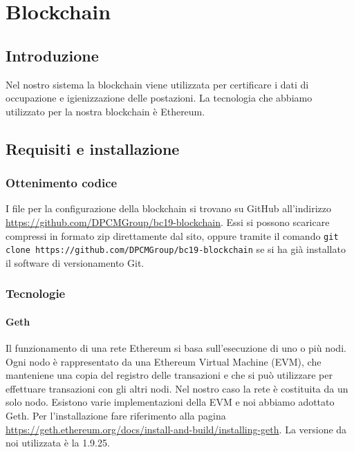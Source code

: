 \section{Blockchain}

\subsection{Introduzione}
Nel nostro sistema la blockchain viene utilizzata per certificare i dati di occupazione e igienizzazione delle postazioni. La tecnologia che abbiamo utilizzato per la nostra blockchain è Ethereum.

\subsection{Requisiti e installazione}

\subsubsection{Ottenimento codice}
I file per la configurazione della blockchain si trovano su GitHub all'indirizzo \url{https://github.com/DPCMGroup/bc19-blockchain}. Essi si possono scaricare compressi in formato zip direttamente dal sito, oppure tramite il comando \newline
\texttt{git clone https://github.com/DPCMGroup/bc19-blockchain} \newline
se si ha già installato il software di versionamento Git.

\subsubsection{Tecnologie}
\paragraph{Geth}
Il funzionamento di una rete Ethereum si basa sull'esecuzione di uno o più nodi. Ogni nodo è rappresentato da una Ethereum Virtual Machine (EVM), che manteniene una copia del registro delle transazioni e che si può utilizzare per effettuare transazioni con gli altri nodi. Nel nostro caso la rete è costituita da un solo nodo. Esistono varie implementazioni della EVM e noi abbiamo adottato Geth. \newline
Per l'installazione fare riferimento alla pagina \url{https://geth.ethereum.org/docs/install-and-build/installing-geth}. \newline
La versione da noi utilizzata è la 1.9.25.

